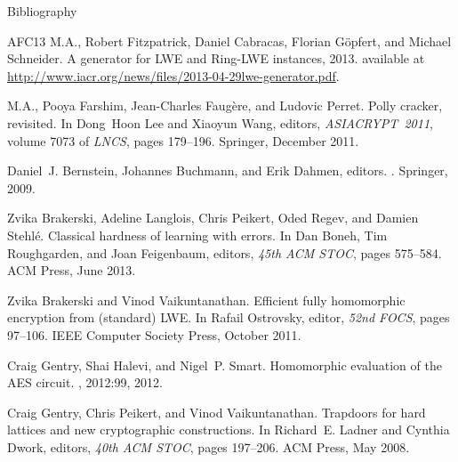 \documentclass[10pt,compress]{beamer}
\begin{document}
\begin{frame}{Bibliography}
\begin{tiny}
\begin{thebibliography}{AFC{\etalchar{+}}13}
M.A., Robert Fitzpatrick, Daniel Cabracas, Florian Göpfert, and
  Michael Schneider.
\newblock A generator for {LWE} and {Ring-LWE} instances, 2013.
\newblock available at
  \url{http://www.iacr.org/news/files/2013-04-29lwe-generator.pdf}.

M.A., Pooya Farshim, Jean-Charles Faug{\`e}re, and Ludovic
  Perret.
\newblock Polly cracker, revisited.
\newblock In Dong~Hoon Lee and Xiaoyun Wang, editors, {\em ASIACRYPT~2011},
  volume 7073 of {\em {LNCS}}, pages 179--196. Springer, December 2011.

Daniel~J. Bernstein, Johannes Buchmann, and Erik Dahmen, editors.
.
\newblock Springer, 2009.

Zvika Brakerski, Adeline Langlois, Chris Peikert, Oded Regev, and Damien
  Stehl{\'e}.
\newblock Classical hardness of learning with errors.
\newblock In Dan Boneh, Tim Roughgarden, and Joan Feigenbaum, editors, {\em
  45th ACM STOC}, pages 575--584. {ACM} Press, June 2013.

Zvika Brakerski and Vinod Vaikuntanathan.
\newblock Efficient fully homomorphic encryption from (standard) {LWE}.
\newblock In Rafail Ostrovsky, editor, {\em 52nd FOCS}, pages 97--106. {IEEE}
  Computer Society Press, October 2011.

Craig Gentry, Shai Halevi, and Nigel~P. Smart.
\newblock Homomorphic evaluation of the {AES} circuit.
, 2012:99, 2012.

Craig Gentry, Chris Peikert, and Vinod Vaikuntanathan.
\newblock Trapdoors for hard lattices and new cryptographic constructions.
\newblock In Richard~E. Ladner and Cynthia Dwork, editors, {\em 40th ACM STOC},
  pages 197--206. {ACM} Press, May 2008.
\end{thebibliography}
\end{tiny}
\end{frame}
\end{document}

